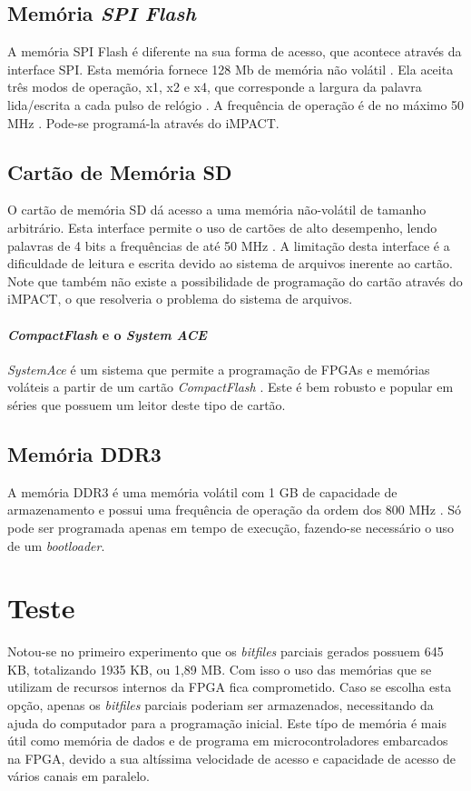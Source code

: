 \documentclass[11pt,a4paper,oneside]{book}
\begin{document}
\subsection{Memória \textit{SPI Flash}}
A memória SPI Flash é diferente na sua forma de acesso, que acontece através da interface SPI.
Esta memória fornece 128 Mb de memória não volátil \cite{ug810}.
Ela aceita três modos de operação, x1, x2 e x4, que corresponde a largura da palavra lida/escrita a cada pulso de relógio \cite{N25Q128}.
A frequência de operação é de no máximo 50 MHz \cite{xapp586}.
Pode-se programá-la através do iMPACT.

\subsection{Cartão de Memória SD}
O cartão de memória SD dá acesso a uma memória não-volátil de tamanho arbitrário.
Esta interface permite o uso de cartões de alto desempenho, lendo palavras de 4 bits a frequências de até 50 MHz \cite{ug810}.
A limitação desta interface é a dificuldade de leitura e escrita devido ao sistema de arquivos inerente ao cartão.
Note que também não existe a possibilidade de programação do cartão através do iMPACT, o que resolveria o problema do sistema de arquivos.

\paragraph{\textit{CompactFlash} e o \textit{System ACE}}
\textit{SystemAce} é um sistema que permite a programação de FPGAs e memórias voláteis a partir de um cartão \textit{CompactFlash} \cite{ds080, ds583}.
Este é bem robusto e popular em séries que possuem um leitor deste tipo de cartão.

\subsection{Memória DDR3}
A memória DDR3 é uma memória volátil com 1 GB de capacidade de armazenamento e possui uma frequência de operação da ordem dos 800 MHz \cite{MT8JTF12864HZ}.
Só pode ser programada apenas em tempo de execução, fazendo-se necessário o uso de um \textit{bootloader}.

\section{Teste}
Notou-se no primeiro experimento que os \textit{bitfiles} parciais gerados possuem 645 KB, totalizando 1935 KB, ou 1,89 MB.
Com isso o uso das memórias que se utilizam de recursos internos da FPGA fica comprometido.
Caso se escolha esta opção, apenas os \textit{bitfiles} parciais poderiam ser armazenados, necessitando da ajuda do computador para a programação inicial.
Este típo de memória é mais útil como memória de dados e de programa em microcontroladores embarcados na FPGA, devido a sua altíssima velocidade de acesso e capacidade de acesso de vários canais em paralelo.
\end{document}
